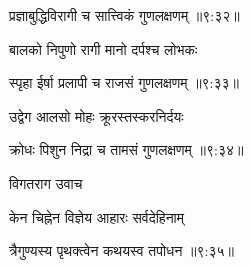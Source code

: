 
{\devanagarifont प्रज्ञाबुद्धिविरागी च सात्त्विकं गुणलक्षणम् {॥९:३२॥} \veg\dontdisplaylinenum }%

{\devanagarifont बालको निपुणो रागी मानो दर्पश्च लोभकः \thinspace{\dandab} \dontdisplaylinenum }%


{\devanagarifont स्पृहा ईर्षा प्रलापी च राजसं गुणलक्षणम् {॥९:३३॥} \veg\dontdisplaylinenum }%

{\devanagarifont उद्वेग आलसो मोहः क्रूरस्तस्करनिर्दयः \thinspace{\dandab} \dontdisplaylinenum }%


{\devanagarifont क्रोधः पिशुन निद्रा च तामसं गुणलक्षणम् {॥९:३४॥} \veg\dontdisplaylinenum }%


 

{\devanagarifont विगतराग उवाच {\dandab}\dontdisplaylinenum  }%
 
{\devanagarifont केन चिह्नेन विज्ञेय आहारः सर्वदेहिनाम् \thinspace{\danda} \dontdisplaylinenum }%


{\devanagarifont त्रैगुण्यस्य पृथक्त्वेन कथयस्व तपोधन {॥९:३५॥} \veg\dontdisplaylinenum }%
    \var{{\devanagarifont \numnoemph\vd ॰धन\lem \mssCaCbCc\msNa\msNb\Ed\  ॰धनः \msNc}}%

